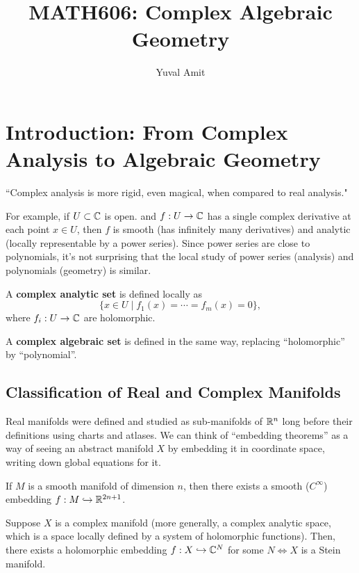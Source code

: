 \documentclass[11pt]{article}
\title{MATH606: Complex Algebraic Geometry}
\author{Yuval Amit}
\date{}
\begin{document}
\maketitle

\tableofcontents
\newpage

\section{Introduction: From Complex Analysis to Algebraic Geometry}

``Complex analysis is more rigid, even magical, when compared to real analysis."

For example, if $U \subset \mathbb{C}$ is open. and $f:U \to \mathbb{C}$ has a single complex derivative at each point $x \in U$, then $f$ is smooth (has infinitely many derivatives) and analytic (locally representable by a power series). Since power series are close to polynomials, it's not surprising that the local study of power series (analysis) and polynomials (geometry) is similar.

\begin{defn}
    A \textbf{complex analytic set} is defined locally as 
    $$\{x \in U \mid f_1(x) =\cdots = f_m(x) =0\},$$ 
    where $f_i: U \to \mathbb{C}$ are holomorphic.

    A \textbf{complex algebraic set} is defined in the same way, replacing ``holomorphic'' by ``polynomial''.
\end{defn}

\subsection{Classification of Real and Complex Manifolds}

Real manifolds were defined and studied as sub-manifolds of $\mathbb{R}^n$ long before their definitions using charts and atlases. We can think of ``embedding theorems'' as a way of seeing an abstract manifold $X$ by embedding it in coordinate space, writing down global equations for it.

\begin{thm}
    If $M$ is a smooth manifold of dimension $n$, then there exists a smooth ($C^\infty$) embedding $f: M \hookrightarrow \mathbb{R}^{2n+1}$.
\end{thm}

Suppose $X$ is a complex manifold (more generally, a complex analytic space, which is a space locally defined by a system of holomorphic functions). Then, there exists a holomorphic embedding $f:X \hookrightarrow \mathbb{C}^N$ for some $N \iff X$ is a Stein manifold.
\end{document}
